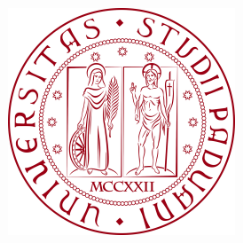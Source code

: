 \begin{titlepage}
    \begin{center}
        \begin{Large}
            \textbf{\myUni}\\
        \end{Large}

        \vspace{5pt}

        \begin{large}
            \textsc{\myDepartment}\\
        \end{large}

        \vspace{5pt}

        \begin{large}
            \textsc{\myFaculty}\\
        \end{large}

        \vspace{25pt}
        
        \begin{figure}[htbp]
            \centering
            \includegraphics[alt={Emblema dell'Università degli Studi di Padova}, height=6cm]{img/logo_unipd.png}
        \end{figure}

        \begin{Large}
            \textbf{\myTitle}\\
        \end{Large}

        \vspace{5pt}

        \begin{large}
            \textit{\myDegree}\\
        \end{large}


\end{center}
\end{titlepage}
